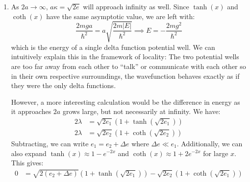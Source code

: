 \begin{sol}
\begin{enumerate}[label=\textbf{(\alph*)}]
\item As $2a\to \infty$, $a\kappa=\sqrt{2e}$ will approach infinity as well. Since $\tanh(x)$ and $\coth(x)$ have the same asymptotic value, we are left with:
$$\frac{2mga}{\hbar^2}=a\sqrt{\frac{2m|E|}{\hbar^2}} \implies E=-\frac{2mg^2}{\hbar^2}$$
which is the energy of a single delta function potential well. We can intuitively explain this in the framework of locality: The two potential wells are too far away from each other to ``talk'' or communicate with each other so in their own respective surroundings, the wavefunction behaves exactly as if they were the only delta functions.
\vspace{2mm}

However, a more interesting calculation would be the difference in energy as it approaches $2a$ grows large, but not necessarily at infinity. We have:
\begin{align*}
    2\lambda &= \sqrt{2e_1}(1+\tanh(\sqrt{2e_1})) \\
    2\lambda &= \sqrt{2e_2}(1+\coth(\sqrt{2e_2}))
\end{align*}
Subtracting, we can write $e_1=e_2+\Delta e$ where $\Delta e \ll e_1$. Additionally, we can also expand $\tanh(x)\approx 1-e^{-2x}$ and $\coth(x)\approx 1+2e^{-2x}$ for large $x$. This gives:
\begin{align*}
    0 &= \sqrt{2(e_2+\Delta e)}(1+\tanh(\sqrt{2e_1}))-\sqrt{2e_2}(1+\coth(\sqrt{2e_1})) \\

\end{align*}
\end{enumerate}
\end{sol}
